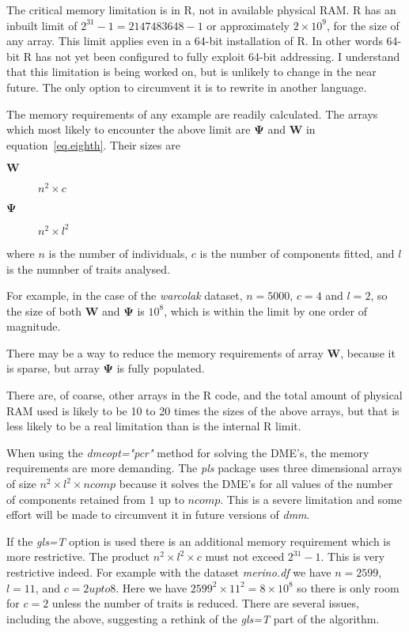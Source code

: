 \documentclass[titlepage]{article}  %
\begin{document}
The critical memory limitation is in R, not in available physical RAM. R has an inbuilt limit of $2^{31} - 1 = 2147483648 - 1$ or approximately $2 \times 10^{9}$, for the size of any array. This limit applies even in a 64-bit installation of R. In other words 64-bit R has not yet been configured to fully exploit 64-bit addressing. I understand that this limitation is being worked on, but is unlikely to change in the near future. The only option to circumvent it is to rewrite in another language.

The memory requirements of any example are readily calculated. The arrays which most likely to encounter the above limit are ${\bm \Psi}$ and ${\bm W}$ in equation~\ref{eq.eighth}. Their sizes are

\begin{description}
\item[${\bm W}$] $n^{2} \times c$
\item[${\bm \Psi}$] $n^{2} \times l^{2}$
\end{description}
 where $n$ is the number of individuals, $c$ is the number of components fitted, and $l$ is the numnber of traits analysed.

For example, in the case of the {\em warcolak} dataset, $n = 5000$, $c = 4$ and $l = 2$, so the size of both ${\bm W}$ and ${\bm \Psi}$ is $10^8$, which is within the limit by one order of magnitude.

There may be a way to reduce the memory requirements of array ${\bm W}$, because it is sparse, but array ${\bm \Psi}$ is fully populated.

There are, of coarse, other arrays in the R code, and the total amount of physical RAM used is likely to be 10 to 20 times the sizes of the above arrays, but that is less likely to be a real limitation than is the internal R limit.

When using the {\em dmeopt="pcr"} method for solving the DME's, the memory requirements are more demanding. The {\em pls} package uses three dimensional arrays of size $n^{2} \times l^{2} \times ncomp$ because it solves the DME's for all values of the number of components retained from $1$ up to $ncomp$. This is a severe limitation and some effort will be made to circumvent it in future versions of {\em dmm}.

If the {\em gls=T} option is used there is an additional memory requirement which is more restrictive. The product $n^{2} \times l^{2} \times c$ must not exceed $2^{31} - 1$. This is very restrictive indeed. For example with the dataset {\em merino.df} we have $n = 2599$, $l = 11$, and $c = 2 upto 8$. Here we have $2599^{2} \times 11^{2} = 8 \times 10^{8}$ so there is only room for $c=2$ unless the number of traits is reduced. There are several issues, including the above,  suggesting a rethink of the {\em gls=T} part of the algorithm.
\end{document}
